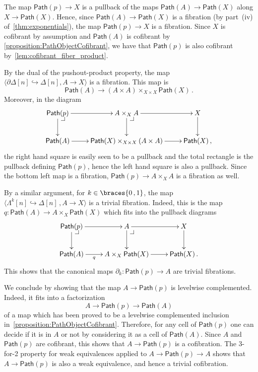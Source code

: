 \documentclass[reqno,10pt,a4paper,oneside,draft]{amsart}
\makeatletter
\renewenvironment{proof}[1][\proofname] {\par\pushQED{\qed}\normalfont\topsep6\p@\@plus6\p@\relax\trivlist\item[\hskip\labelsep\bf#1\@addpunct{.}]\ignorespaces}{\popQED\endtrivlist\@endpefalse}
\numberwithin{equation}{section}
\theoremstyle{mythm}
\theoremstyle{mydef}
\theoremstyle{myrmk}
\newcommand{\pullback}[1]{\save*!/#1-1.2pc/#1:(-1,1)@^{|-}\restore}
\newcommand{\drpullback}{\pullback{dr}}
\newcommand{\co}{\colon}
\DeclarePairedDelimiter\braces\lbrace\rbrace
\newcommand{\Path}{\mathsf{Path}}
\makeatother
\begin{document}
\begin{proof} The map $\Path(p) \rightarrow X$ is a pullback of the maps $\Path(A) \rightarrow \Path(X)$ along $X \rightarrow \Path(X)$. Hence, since $\Path(A) \rightarrow \Path(X)$ is a fibration (by part~(iv) of~\cref{thm:exponentials}), the map $\Path(p) \rightarrow X$ is a fibration. Since $X$ is cofibrant by assumption and $\Path(A)$ is  cofibrant by \cref{proposition:PathObjectCofibrant}, we have that $\Path(p)$ is also cofibrant by~\cref{lem:cofibrant_fiber_product}. 

By the dual of the pushout-product property, the map $\langle \partial \Delta[n] \hookrightarrow \Delta[n] ,  A \rightarrow X \rangle$ is a fibration. This map is 
\[ 
\Path(A) \rightarrow (A \times A) \times_{X \times X} \Path(X) \, .
\] 
Moreover, in the diagram
\[
\xymatrix{
\Path(p) \drpullback \ar[r] \ar[d] & A \times_{X} A \ar[d] \ar[r] \drpullback & X \ar[d] \\
\Path(A) \ar[r] & \Path(X) \times_{X \times X}  (A \times A) \ar[r]  & \Path(X) \, ,
}
 \]
the right hand square is easily seen to be a pullback and the total rectangle is the pullback defining $\Path(p)$, hence the left hand square is also a pullback. Since the bottom left map is a fibration,  $\Path(p) \rightarrow A \times_{X} A$ is a fibration as well.

By a similar argument, for $k \in \braces{ 0 \, , 1}$, the map $\langle \Lambda^k[n] \hookrightarrow \Delta[n] \, , A \rightarrow X\rangle$ is a trivial fibration. Indeed, this is the map $q \co \Path(A) \rightarrow  A  \times_X \Path(X)$ which fits into the pullback diagrams
\[
\xymatrix{
\Path(p) \drpullback \ar[r] \ar[d] & A  \ar[d] \ar[r] \drpullback & X \ar[d] \\
\Path(A) \ar[r]_-{q} & A \times_X \Path(X) \ar[r]  & \Path(X) \, .
}
 \]
This shows that the canonical maps $\partial_k \co \Path(p) \rightarrow A$ are trivial fibrations.

We conclude by showing that the map $A \rightarrow \Path(p)$ is levelwise complemented. Indeed, it fits into a factorization 
\[
A \rightarrow \Path(p) \rightarrow \Path(A)
\] 
of a map which has been proved to be a levelwise complemented inclusion in~\cref{proposition:PathObjectCofibrant}. Therefore, for any cell of $\Path(p)$ one can decide if it is in $A$ or not by considering it as a cell of $\Path(A)$. Since $A$ and $\Path(p)$ are cofibrant, this shows that $A \rightarrow \Path(p)$ is a cofibration. The 3-for-2 property for weak equivalences applied to $A \rightarrow \Path(p) \rightarrow A$ shows that  $A \rightarrow \Path(p)$ is also a weak equivalence, and hence a trivial cofibration.
\end{proof}
\end{document}
